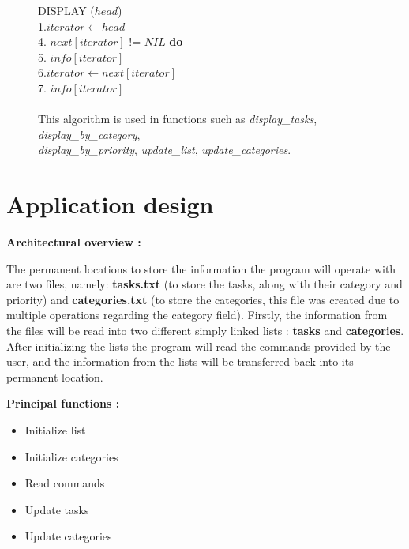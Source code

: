 \documentclass{article}
\begin{document}
\begin{figure}[ht]
\begin{center}
\begin{tabbing}
DISPLAY ($head$) \\
1.\indent $iterator \leftarrow head$\\
4.\= $next[iterator]$  != $NIL$ {\bf do}\\
5.\indent   {} $\textit{info}[iterator]$\\
6.\indent   \>$iterator \leftarrow next[iterator]$\\
7. $\textit{info}[iterator]$\\
\\
This algorithm is used in functions such as \textit{display\_tasks}, \textit{display\_by\_category},\\ \textit{display\_by\_priority}, \textit{update\_list}, \textit{update\_categories}.
\end{tabbing}
\end{center}
\end{figure}




\section{Application design}

     \vspace{0.5cm}
     
    \textbf{Architectural overview :}
   
    \vspace{0.5cm}
    The permanent locations to store the information the program will operate with are two files, namely: \textbf{tasks.txt} (to store the tasks, along with their category and priority) and \textbf{categories.txt} (to store the categories, this file was created due to multiple operations regarding the category field). Firstly, the information from the files will be read into two different simply linked lists : \textbf{tasks} and \textbf{categories}. After initializing the lists the program will read the commands provided by the user, and the information from the lists will be transferred back into its permanent location.
    \vspace{1.5cm}

    \textbf{Principal functions : }
        \begin{itemize}
            \item Initialize list
            \item Initialize categories
            \item Read commands
            \item Update tasks
            \item Update categories
        \end{itemize}
\end{document}
